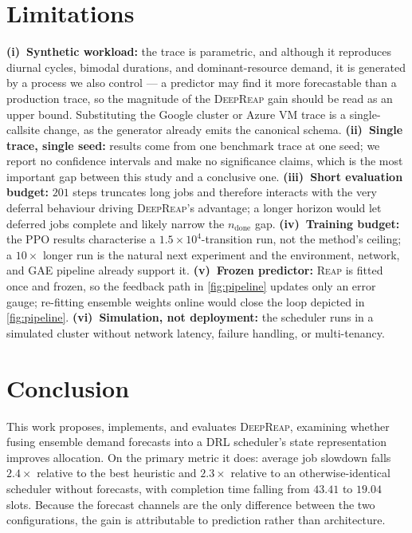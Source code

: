 \documentclass{svproc}
\newcommand{\reap}{\textsc{Reap}}
\newcommand{\deepreap}{\textsc{DeepReap}}
\begin{document}
\section{Limitations}\label{sec:limitations}
\textbf{(i)~Synthetic workload:} the trace is parametric, and although
it reproduces diurnal cycles, bimodal durations, and dominant-resource
demand, it is generated by a process we also control --- a predictor may
find it more forecastable than a production trace, so the magnitude of
the \deepreap{} gain should be read as an upper bound. Substituting the
Google cluster or Azure VM trace is a single-callsite change, as the
generator already emits the canonical schema.
\textbf{(ii)~Single trace, single seed:} results come from one
benchmark trace at one seed; we report no confidence intervals and make
no significance claims, which is the most important gap between this
study and a conclusive one.
\textbf{(iii)~Short evaluation budget:} $201$ steps truncates long jobs
and therefore interacts with the very deferral behaviour driving
\deepreap{}'s advantage; a longer horizon would let deferred jobs
complete and likely narrow the $n_{\text{done}}$ gap.
\textbf{(iv)~Training budget:} the PPO results characterise a
$1.5\times10^4$-transition run, not the method's ceiling; a
$10\times$ longer run is the natural next experiment and the
environment, network, and GAE pipeline already support it.
\textbf{(v)~Frozen predictor:} \reap{} is fitted once and frozen, so
the feedback path in \cref{fig:pipeline} updates only an error gauge;
re-fitting ensemble weights online would close the loop depicted in
\cref{fig:pipeline}.
\textbf{(vi)~Simulation, not deployment:} the scheduler runs in a
simulated cluster without network latency, failure handling, or
multi-tenancy.

\section{Conclusion}\label{sec:conclusion}
This work proposes, implements, and evaluates \deepreap{}, examining
whether fusing ensemble demand forecasts into a DRL scheduler's state
representation improves allocation. On the primary metric it does: average job slowdown falls
$2.4\times$ relative to the best heuristic and $2.3\times$ relative to
an otherwise-identical scheduler without forecasts, with completion
time falling from $43.41$ to $19.04$ slots. Because the forecast
channels are the only difference between the two configurations, the
gain is attributable to prediction rather than architecture.
\end{document}
